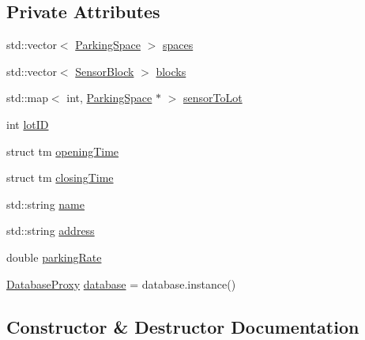 \subsection*{Private Attributes}
\begin{DoxyCompactItemize}
\item 
std\+::vector$<$ \mbox{\hyperlink{class_parking_space}{Parking\+Space}} $>$ \mbox{\hyperlink{class_parking_lot_ab4e93d05c1bb85849504c26cb12a6813}{spaces}}
\item 
std\+::vector$<$ \mbox{\hyperlink{class_sensor_block}{Sensor\+Block}} $>$ \mbox{\hyperlink{class_parking_lot_ab5c594dda31fdbef491887eb57162658}{blocks}}
\item 
std\+::map$<$ int, \mbox{\hyperlink{class_parking_space}{Parking\+Space}} $\ast$ $>$ \mbox{\hyperlink{class_parking_lot_a238562d70b99f294898ddf21972d51c3}{sensor\+To\+Lot}}
\item 
int \mbox{\hyperlink{class_parking_lot_aa8002685719766c66877ab35d4f80f17}{lot\+ID}}
\item 
struct tm \mbox{\hyperlink{class_parking_lot_af6162bf724fb438c5c703989ce0bd10a}{opening\+Time}}
\item 
struct tm \mbox{\hyperlink{class_parking_lot_ae3607cdf93ec2858e0ce1214c950b255}{closing\+Time}}
\item 
std\+::string \mbox{\hyperlink{class_parking_lot_aaef3c99a2d6e7398325db451183c9cae}{name}}
\item 
std\+::string \mbox{\hyperlink{class_parking_lot_a0a2cd92fd4fb8e78530613df950a44bb}{address}}
\item 
double \mbox{\hyperlink{class_parking_lot_a1b80d2bddbd40ebe71d8b89a00410e03}{parking\+Rate}}
\item 
\mbox{\hyperlink{class_database_proxy}{Database\+Proxy}} \mbox{\hyperlink{class_parking_lot_a4eef5645d82097e7b1ab4c417f27ecff}{database}} = database.\+instance()
\end{DoxyCompactItemize}


\subsection{Constructor \& Destructor Documentation}
\mbox{\label{class_parking_lot_af06c47fd4a50e7b2215cf2867876cc0c}} 
